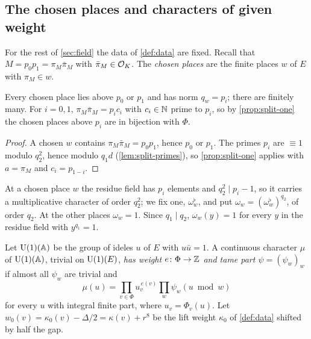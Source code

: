 \subsection{The chosen places and characters of given weight}\label{ss:chosen}
For the rest of \cref{sec:field} the data of \cref{def:data} are fixed. Recall that $M=p_0p_1=\pi_M\bar\pi_M$
with $\bar\pi_M\in\mathcal{O}_K$. The \emph{chosen places} are the finite places $w$ of $E$ with $\pi_M\in w$.

\begin{lemma}\label{lem:chosen}
Every chosen place lies above $p_0$ or $p_1$ and has norm $q_w=p_i$; there are finitely many. For
$i=0,1$, $\pi_M\bar\pi_M=p_i c_i$ with $c_i\in\mathbb{N}$ prime to $p_i$, so by \cref{prop:split-one} the
chosen places above $p_i$ are in bijection with $\Phi$.
\end{lemma}

\begin{proof}
A chosen $w$ contains $\pi_M\bar\pi_M=p_0p_1$, hence $p_0$ or $p_1$. The primes $p_i$ are $\equiv1$
modulo $q_2^2$, hence modulo $q_1d$ (\cref{lem:split-primes}), so \cref{prop:split-one} applies with
$a=\pi_M$ and $c_i=p_{1-i}$.
\end{proof}

At a chosen place $w$ the residue field has $p_i$ elements and $q_2^2\mid p_i-1$, so it carries a
multiplicative character of order $q_2^2$; we fix one, $\omega_w^\flat$, and put
$\omega_w=(\omega^\flat_w)^{q_2}$, of order $q_2$. At the other places $\omega_w=1$. Since $q_1\mid
q_2$, $\omega_w(y)=1$ for every $y$ in the residue field with $y^{q_1}=1$.

Let $\operatorname{U}(1)(\mathbb{A})$ be the group of ideles $u$ of $E$ with $u\bar u=1$. A continuous character $\mu$ of
$\operatorname{U}(1)(\mathbb{A})$, trivial on $\operatorname{U}(1)(E)$, \emph{has weight $e\colon\Phi\to\mathbb{Z}$ and tame part
$\psi=(\psi_w)_w$} if almost all $\psi_w$ are trivial and
\[
  \mu(u)=\prod_{v\in\Phi}u_v^{\,e(v)}\prod_{w}\psi_w(u\bmod w)
\]
for every $u$ with integral finite part, where $u_v=\Phi_v(u)$. Let
$w_0(v)=\kappa_0(v)-\Delta/2=\kappa(v)+r^8$ be the lift weight $\kappa_0$ of \cref{def:data} shifted
by half the gap.

